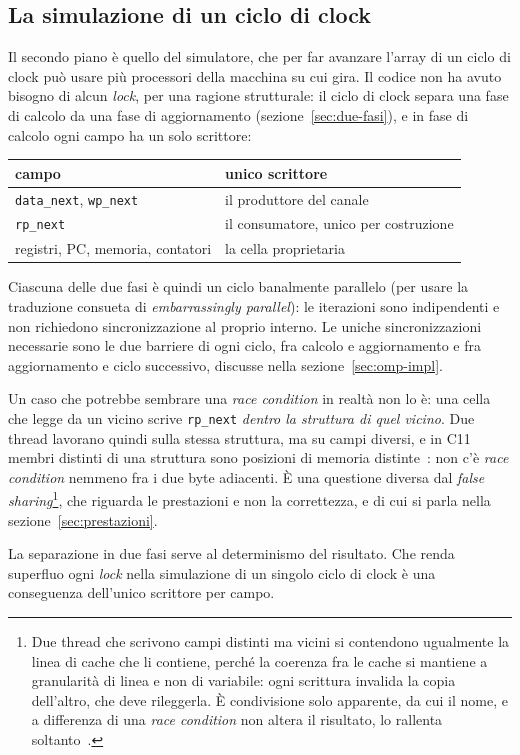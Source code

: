 \subsection{La simulazione di un ciclo di clock}

Il secondo piano è quello del simulatore, che per far avanzare l'array di un
ciclo di clock può usare più processori della macchina su cui gira. Il codice
non ha avuto bisogno di alcun \emph{lock}, per una ragione strutturale: il ciclo
di clock separa una fase di calcolo da una fase di aggiornamento
(sezione~\ref{sec:due-fasi}), e in fase di calcolo ogni campo ha un solo
scrittore:

\begin{center}
\begin{tabular}{ll}
    \toprule
    campo & unico scrittore \\
    \midrule
    \texttt{data\_next}, \texttt{wp\_next} & il produttore del canale \\
    \texttt{rp\_next} & il consumatore, unico per costruzione \\
    registri, PC, memoria, contatori & la cella proprietaria \\
    \bottomrule
\end{tabular}
\end{center}

Ciascuna delle due fasi è quindi un ciclo banalmente parallelo (per usare la
traduzione consueta di \emph{embarrassingly parallel}): le iterazioni sono
indipendenti e non richiedono sincronizzazione al proprio interno. 
Le uniche sincronizzazioni necessarie sono le due barriere di ogni ciclo, fra
calcolo e aggiornamento e fra aggiornamento e ciclo successivo, discusse nella
sezione~\ref{sec:omp-impl}.

Un caso che potrebbe sembrare una \emph{race condition} in realtà non lo è: una cella
che legge da un vicino scrive \texttt{rp\_next} \emph{dentro la struttura di
quel vicino}. Due thread lavorano quindi sulla stessa struttura, ma su campi
diversi, e in C11 membri distinti di una struttura sono posizioni di memoria
distinte~\cite{C11}: non c'è \emph{race condition} nemmeno fra i due byte adiacenti. È una
questione diversa dal \emph{false sharing}\footnote{Due thread che scrivono
campi distinti ma vicini si contendono ugualmente la linea di cache che li
contiene, perché la coerenza fra le cache si mantiene a granularità di linea e
non di variabile: ogni scrittura invalida la copia dell'altro, che deve
rileggerla. È condivisione solo apparente, da cui il nome, e a differenza di una
\emph{race condition} non altera il risultato, lo rallenta soltanto~\cite{Torrellas}.},
che riguarda le prestazioni e non la correttezza, e di cui si parla nella
sezione~\ref{sec:prestazioni}.

La separazione in due fasi serve al determinismo del risultato. Che renda
superfluo ogni \emph{lock} nella simulazione di un singolo ciclo di clock è una
conseguenza dell'unico scrittore per campo.
